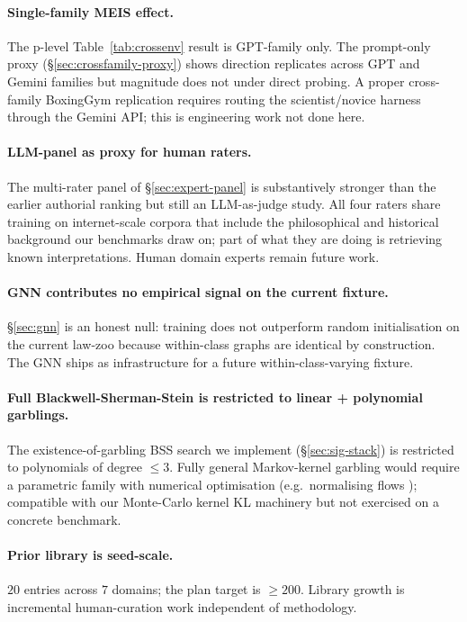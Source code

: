 \documentclass{article}
\begin{document}
\paragraph{Single-family MEIS effect.} The p-level
Table~\ref{tab:crossenv} result is GPT-family only. The prompt-only
proxy (\S\ref{sec:crossfamily-proxy}) shows direction replicates
across GPT and Gemini families but magnitude does not under direct
probing. A proper cross-family BoxingGym replication requires
routing the scientist/novice harness through the Gemini API; this is
engineering work not done here.

\paragraph{LLM-panel as proxy for human raters.} The multi-rater
panel of \S\ref{sec:expert-panel} is substantively stronger than the
earlier authorial ranking but still an LLM-as-judge study. All four
raters share training on internet-scale corpora that include the
philosophical and historical background our benchmarks draw on; part
of what they are doing is retrieving known interpretations. Human
domain experts remain future work.

\paragraph{GNN contributes no empirical signal on the current fixture.}
\S\ref{sec:gnn} is an honest null: training does not outperform
random initialisation on the current law-zoo because within-class
graphs are identical by construction. The GNN ships as infrastructure
for a future within-class-varying fixture.

\paragraph{Full Blackwell-Sherman-Stein is restricted to linear +
polynomial garblings.} The existence-of-garbling BSS search we
implement (\S\ref{sec:sig-stack}) is restricted to polynomials of
degree $\leq 3$. Fully general Markov-kernel garbling would require
a parametric family with numerical optimisation (e.g.\ normalising
flows \citep{rezende2015flows}); compatible with our Monte-Carlo
kernel KL machinery but not exercised on a concrete benchmark.

\paragraph{Prior library is seed-scale.} $20$ entries across $7$
domains; the plan target is $\geq 200$. Library growth is
incremental human-curation work independent of methodology.
\end{document}

